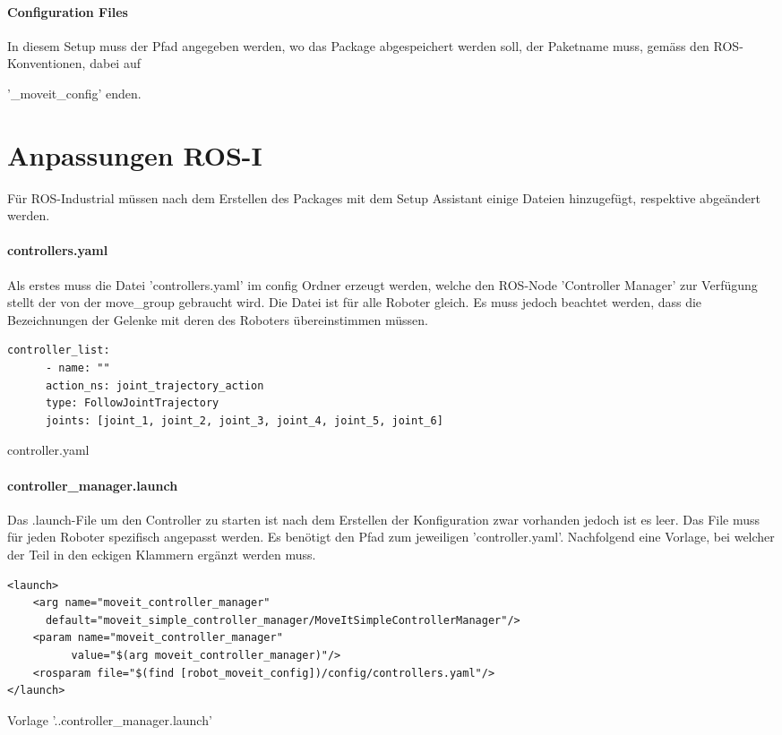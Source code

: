 \paragraph{Configuration Files}
In diesem Setup muss der Pfad angegeben werden, wo das Package abgespeichert werden soll, der Paketname muss, gemäss den ROS-Konventionen, dabei auf

'\_moveit\_config' enden. %


\section{Anpassungen ROS-I}
Für ROS-Industrial müssen nach dem Erstellen des Packages mit dem Setup Assistant einige Dateien hinzugefügt, respektive abgeändert werden. 
\paragraph{controllers.yaml}
Als erstes muss die Datei 'controllers.yaml' im config Ordner erzeugt werden, welche den ROS-Node 'Controller Manager' zur Verfügung stellt der von der move\_group gebraucht wird. Die Datei ist für alle Roboter gleich. Es muss jedoch beachtet werden, dass die Bezeichnungen der Gelenke mit deren des Roboters übereinstimmen müssen. 
\begin{code}
	\begin{verbatim}
controller_list:
      - name: ""
      action_ns: joint_trajectory_action
      type: FollowJointTrajectory
      joints: [joint_1, joint_2, joint_3, joint_4, joint_5, joint_6]
	\end{verbatim}
	\vspace{-15pt}
	\caption{controller.yaml}
	\label{code:controller}
\end{code}

\paragraph{controller\_manager.launch}
Das .launch-File um den Controller zu starten ist nach dem Erstellen der Konfiguration zwar vorhanden jedoch ist es leer. Das File muss für jeden Roboter spezifisch angepasst werden. Es benötigt den Pfad zum jeweiligen 'controller.yaml'. Nachfolgend eine Vorlage, bei welcher der Teil in den eckigen Klammern ergänzt werden muss.
\begin{code}
	\begin{verbatim}
<launch>
	<arg name="moveit_controller_manager"
	  default="moveit_simple_controller_manager/MoveItSimpleControllerManager"/>
	<param name="moveit_controller_manager"
	      value="$(arg moveit_controller_manager)"/>	
	<rosparam file="$(find [robot_moveit_config])/config/controllers.yaml"/>
</launch>	
	\end{verbatim}
	\vspace{-15pt}
	\caption{Vorlage '..controller\_manager.launch'}
	\label{code:controllerManager}
\end{code}

